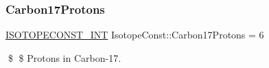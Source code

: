 \subsubsection{\texorpdfstring{Carbon17\+Protons}{Carbon17Protons}}
{\footnotesize\ttfamily \mbox{\hyperlink{group___isotope_const-_macros_ga5f18360b3e99483a35c32d789e62621c}{I\+S\+O\+T\+O\+P\+E\+C\+O\+N\+S\+T\+\_\+\+I\+NT}} Isotope\+Const\+::\+Carbon17\+Protons = 6}

\$ \$ Protons in Carbon-\/17. 